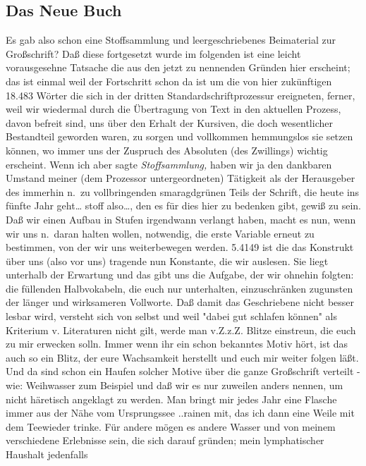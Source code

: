 \documentclass[
]{article}
\author{}
\date{\vspace{-2.5em}}
\begin{document}
\subsection{Das Neue Buch}\label{das-neue-buch}

Es gab also schon eine Stoffsammlung und leergeschriebenes Beimaterial
zur Großschrift? Daß diese fortgesetzt wurde im folgenden ist eine
leicht vorausgesehne Tatsache die aus den jetzt zu nennenden Gründen
hier erscheint; das ist einmal weil der Fortschritt schon da ist um die
von hier zukünftigen 18.483 Wörter die sich in der dritten
Standardschriftprozessur ereigneten, ferner, weil wir wiedermal durch
die Übertragung von Text in den aktuellen Prozess, davon befreit sind,
uns über den Erhalt der Kursiven, die doch wesentlicher Bestandteil
geworden waren, zu sorgen und vollkommen hemmungslos sie setzen können,
wo immer uns der Zuspruch des Absoluten (des Zwillings) wichtig
erscheint. Wenn ich aber sagte \emph{Stoffsammlung,} haben wir ja den
dankbaren Umstand meiner (dem Prozessor untergeordneten) Tätigkeit als
der Herausgeber des immerhin n.~zu vollbringenden smaragdgrünen Teils
der Schrift, die heute ins fünfte Jahr geht\ldots{} stoff also\ldots,
den es für dies hier zu bedenken gibt, gewiß zu sein. Daß wir einen
Aufbau in Stufen irgendwann verlangt haben, macht es nun, wenn wir uns
n.~daran halten wollen, notwendig, die erste Variable erneut zu
bestimmen, von der wir uns weiterbewegen werden. 5.4149 ist die das
Konstrukt über uns (also vor uns) tragende nun Konstante, die wir
auslesen. Sie liegt unterhalb der Erwartung und das gibt uns die
Aufgabe, der wir ohnehin folgten: die füllenden Halbvokabeln, die euch
nur unterhalten, einzuschränken zugunsten der länger und wirksameren
Vollworte. Daß damit das Geschriebene nicht besser lesbar wird, versteht
sich von selbst und weil "dabei gut schlafen können" als Kriterium v.
Literaturen nicht gilt, werde man v.Z.z.Z. Blitze einstreun, die euch zu
mir erwecken solln. Immer wenn ihr ein schon bekanntes Motiv hört, ist
das auch so ein Blitz, der eure Wachsamkeit herstellt und euch mir
weiter folgen läßt. Und da sind schon ein Haufen solcher Motive über die
ganze Großschrift verteilt - wie: Weihwasser zum Beispiel und daß wir es
nur zuweilen anders nennen, um nicht häretisch angeklagt zu werden. Man
bringt mir jedes Jahr eine Flasche immer aus der Nähe vom Ursprungssee
..rainen mit, das ich dann eine Weile mit dem Teewieder trinke. Für
andere mögen es andere Wasser und von meinem verschiedene Erlebnisse
sein, die sich darauf gründen; mein lymphatischer Haushalt jedenfalls
\end{document}
